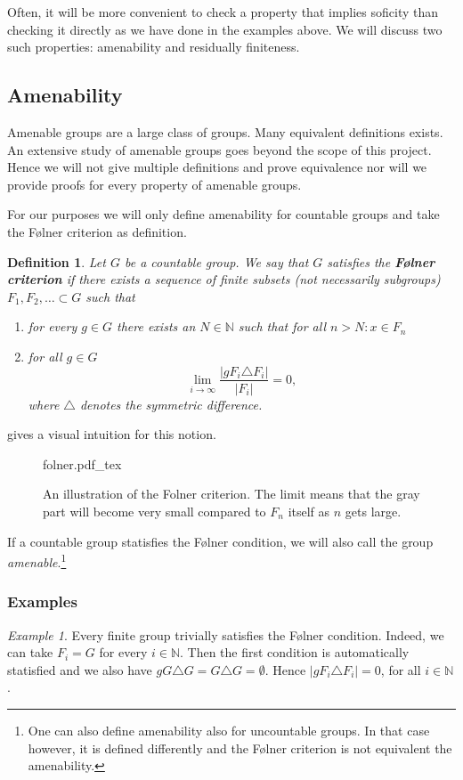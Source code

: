 \documentclass[titlepage, a4paper]{article}
\newcommand{\N}{\mathbb{N}}
\newcommand{\card}[1]{\left| #1 \right|}
\newtheorem{definition}{Definition}
\theoremstyle{remark}
\newtheorem{example}{Example}
\newcommand{\incfig}[1]{%
    \def\svgwidth{.5\columnwidth}
    {#1.pdf_tex}
}
\begin{document}
    Often, it will be more convenient to check a property that implies soficity than checking it directly as we have done in the examples above. We will discuss two such properties: amenability and residually finiteness.

    \subsection{Amenability}

    Amenable groups are a large class of groups. 
    Many equivalent definitions exists. 
    An extensive study of amenable groups goes beyond the scope of this project. Hence we will not give multiple definitions and prove equivalence nor will we provide proofs for every property of amenable groups.

    For our purposes we will only define amenability for countable groups and take the Følner criterion as definition.

    \begin{definition}\cite{noauthor_folner_2019} \label{def:folner}
	    Let $G$ be a countable group. We say that $G$ satisfies the \textbf{Følner criterion} if there exists a sequence of finite subsets (not necessarily subgroups) $F_1, F_2, \dots \subset G$ such that 
        \begin{enumerate}
            \item for every $g \in G$ there exists an $N \in \N$ such that for all $n > N: x \in F_n$
            \item for all $g \in G$ 
            \[\lim_{i\to \infty} \frac{\card{gF_i \triangle F_i}}{\card{F_i}} = 0, \]
            where $\triangle$ denotes the symmetric difference.
        \end{enumerate}
    \end{definition}
     gives a visual intuition for this notion. 
\begin{figure}[ht]
    \centering
    \incfig{folner}
    \caption{An illustration of the Folner criterion. The limit means that the gray part will become very small compared to  $F_n$ itself as $n$ gets large.}
    \label{fig:folner}
\end{figure}
If a countable group statisfies the Følner condition, we will also call the group \emph{amenable}.\footnote{One can also define amenability also for uncountable groups. In that case however, it is defined differently and the Følner criterion is not equivalent the amenability.}
\subsubsection{Examples}
\begin{example}\label{ex:finite_group_folner}
    Every finite group trivially satisfies the Følner condition. Indeed, we can take $F_i = G$ for every $i \in \N$. Then the first condition is automatically statisfied and we also have $gG \triangle G = G \triangle G = \emptyset$. Hence $\card{gF_i\triangle F_i} = 0$, for all $i \in \N$.
\end{example}
\end{document}
